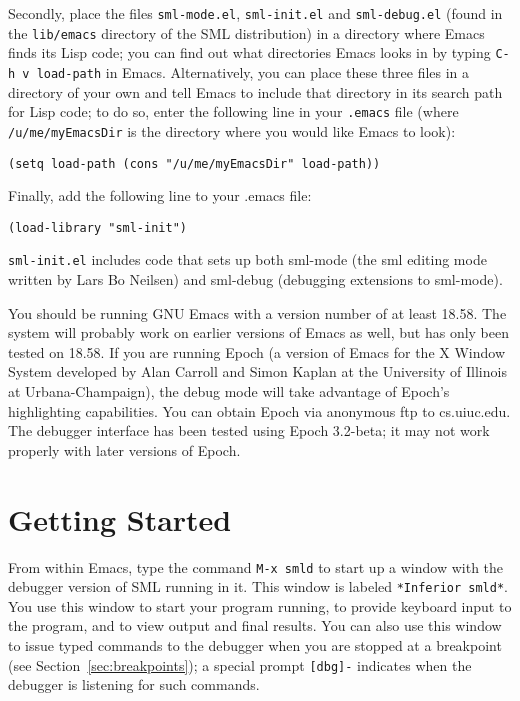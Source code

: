 Secondly, place the files {\tt sml-mode.el}, {\tt sml-init.el} and 
{\tt sml-debug.el}
(found in the {\tt lib/emacs} directory of the SML distribution) in
a directory where Emacs finds its Lisp code; you can find out what
directories Emacs looks in by typing \verb'C-h v load-path' in Emacs.
Alternatively, you can place these three files in a directory of your own
and tell Emacs to include that directory in its search path for Lisp
code; to do so, enter the following line in your {\tt .emacs} file (where
\verb'/u/me/myEmacsDir' is the directory where you would like Emacs to
look):

\begin{verbatim}
(setq load-path (cons "/u/me/myEmacsDir" load-path))
\end{verbatim}

Finally, add the following line to your .emacs file:

\begin{verbatim}
(load-library "sml-init")
\end{verbatim}

{\tt sml-init.el} includes code that sets up both sml-mode (the sml editing
mode written by Lars Bo Neilsen) and sml-debug (debugging extensions
to sml-mode).

You should be running GNU Emacs with a version number of at least
18.58.  The system will probably work on earlier versions of Emacs as
well, but has only been tested on 18.58.  If you are running Epoch (a
version of Emacs for the X Window System developed by Alan Carroll and
Simon Kaplan at the University of Illinois at Urbana-Champaign), the
debug mode will take advantage of Epoch's highlighting capabilities.
You can obtain Epoch via anonymous ftp to cs.uiuc.edu.  The debugger 
interface has been tested using Epoch 3.2-beta; it may not work properly
with later versions of Epoch.

\section{Getting Started}
\label{sec:starting}
From within Emacs, type the command \verb'M-x smld' to start up a
window with the debugger version of SML running in it. This window is labeled
\verb'*Inferior smld*'. 
You use this window to start your program running, to provide
keyboard input to the program, and to view output and final results.
You can also use this window to issue typed commands to the debugger when
you are stopped at a breakpoint (see Section~\ref{sec:breakpoints}); 
a special prompt \verb'[dbg]-' indicates
when the debugger is listening for such commands.

